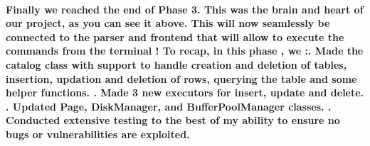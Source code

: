 \documentclass{article}
\begin{document}
\paragraph{
    Finally we reached the end of Phase 3. This was the brain and heart of our project, as you can see it above.
    This will now seamlessly be connected to the parser and frontend that will allow to execute the commands from the terminal !
    To recap, in this phase , we :. Made the catalog class with support to handle creation and deletion of tables, insertion, updation and deletion of rows, querying the table and some helper functions. . Made 3 new executors for insert, update and delete. . Updated Page, DiskManager, and BufferPoolManager classes. . Conducted extensive testing to the best of my ability to ensure no bugs or vulnerabilities are exploited. \newline 
}
\end{document}
